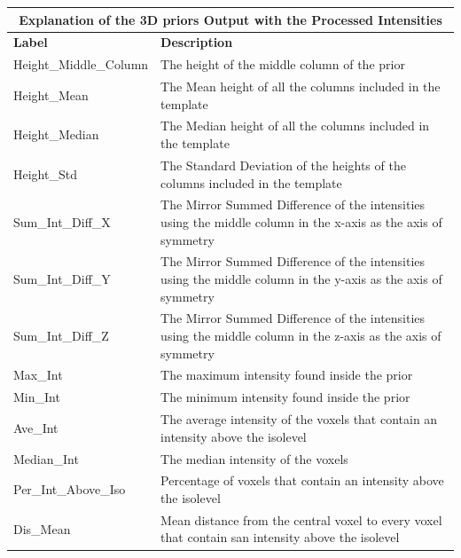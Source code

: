 \documentclass{article}
\begin{document}
	
		
		\newpage
		\begin{longtable}
			{|p{4.65cm}|p{9.45cm}|}
			\toprule
			\multicolumn{2}{|c|}{\textbf{Explanation of the 3D priors Output with the Processed Intensities}} \\
			\midrule
			\textbf{Label} & \textbf{Description} \\ 
			\cmidrule(r){1-1}\cmidrule(l){2-2}
			Height\_Middle\_Column& The height of the middle column of the prior
			\\
			\cmidrule(r){1-1}\cmidrule(l){2-2}
			Height\_Mean& The Mean height of all the columns included in the template\\
			\cmidrule(r){1-1}\cmidrule(l){2-2}
			Height\_Median& The Median height of all the columns included in the template
			\\
			\cmidrule(r){1-1}\cmidrule(l){2-2}
			Height\_Std&The Standard Deviation of the heights of the columns included in the template \\
			\cmidrule(r){1-1}\cmidrule(l){2-2}
			Sum\_Int\_Diff\_X& The Mirror Summed Difference of the intensities using the middle column in the x-axis as the axis of symmetry \\
			\cmidrule(r){1-1}\cmidrule(l){2-2}
			Sum\_Int\_Diff\_Y& The Mirror Summed Difference of the intensities using the middle column in the y-axis as the axis of symmetry\\
			\cmidrule(r){1-1}\cmidrule(l){2-2}
			Sum\_Int\_Diff\_Z& The Mirror Summed Difference of the intensities using the middle column in the z-axis as the axis of symmetry\\
			\cmidrule(r){1-1}\cmidrule(l){2-2}
			Max\_Int& The maximum intensity found inside the prior\\
			\cmidrule(r){1-1}\cmidrule(l){2-2}
			Min\_Int& The minimum intensity found inside the prior\\
			\cmidrule(r){1-1}\cmidrule(l){2-2}
			Ave\_Int& The average intensity of the voxels that contain an intensity above the isolevel\\
			\cmidrule(r){1-1}\cmidrule(l){2-2}
			Median\_Int& The median intensity of the voxels\\
			\cmidrule(r){1-1}\cmidrule(l){2-2}
			Per\_Int\_Above\_Iso& Percentage of voxels that contain an intensity above the isolevel\\
			\cmidrule(r){1-1}\cmidrule(l){2-2}
			Dis\_Mean& Mean distance from the central voxel to every voxel that contain san intensity above the isolevel  \\

\end{longtable}
\end{document}
